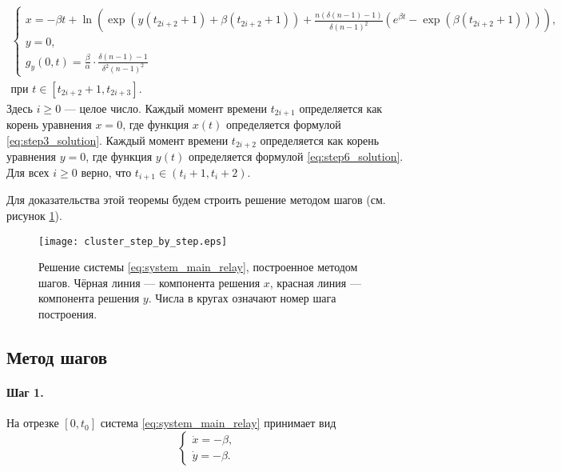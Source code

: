 \begin{theorem}
	\begin{multline}
		\label{eq:step9_solution}
		\begin{cases}
			x = -\beta t + \ln\left(\exp(y(t_{2i + 2} + 1) + \beta(t_{2i + 2} + 1)) + \frac{n (\delta(n - 1) - 1)}{\delta (n - 1)^2} (e^{\beta t} - \exp(\beta (t_{2i + 2} + 1))) \right),\\
			y = 0,\\
			g_y(0, t) = \frac{\beta}{\alpha} \cdot \frac{\delta (n - 1) - 1}{\delta^2 (n - 1)^2}
		\end{cases}\\
		\text{при } t \in [t_{2i + 2} + 1, t_{2i + 3}].
	\end{multline}
	\normalsize
	Здесь $i \geqslant 0$ --- целое число. Каждый момент времени $t_{2i + 1}$ определяется как корень уравнения $x = 0$, где функция $x(t)$ определяется формулой \eqref{eq:step3_solution}. Каждый момент времени $t_{2i + 2}$ определяется как корень уравнения $y = 0$, где функция $y(t)$ определяется формулой \eqref{eq:step6_solution}. Для всех $i \geqslant 0$ верно, что $t_{i + 1} \in (t_i + 1, t_i + 2)$.
\end{theorem}

Для доказательства этой теоремы будем строить решение методом шагов (см. рисунок \ref{fig:cluster_step_by_step}).

\begin{figure}[!ht]
	\centering
	\texttt{[image: cluster\_step\_by\_step.eps]}
	\caption{Решение системы \eqref{eq:system_main_relay}, построенное методом шагов. Чёрная линия --- компонента решения $x$, красная линия --- компонента решения $y$. Числа в кругах означают номер шага построения.}
	\label{fig:cluster_step_by_step}
\end{figure}


\subsection{Метод шагов}
\paragraph{Шаг 1.} На отрезке $[0, t_0]$ система \eqref{eq:system_main_relay} принимает вид
%
\begin{equation}
	\label{eq:step1_system}
	\begin{cases}
		\dot{x} = -\beta,\\
		\dot{y} = -\beta.
	\end{cases}
\end{equation}

